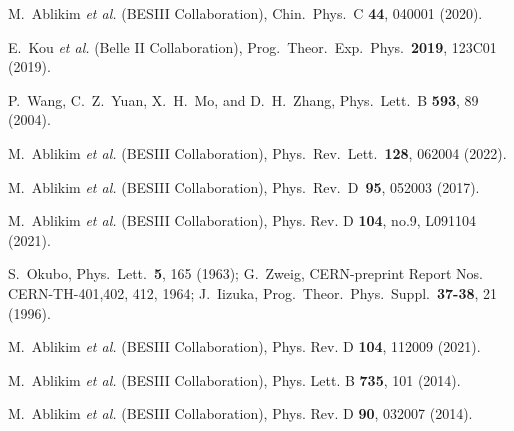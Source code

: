 \documentclass[%
preprint,
 amsmath,amssymb,
 aps,
]{revtex4-2}
\newcommand{\EE}{e^+e^-}
\newcommand{\jpsi}{J/\psi}
\newcommand{\gev}{\mathrm{GeV}}
\begin{document}
\begin{thebibliography}{**}
M.~Ablikim {\it et al.} (BESIII Collaboration),
Chin.\ Phys.\ C {\bf 44}, 040001 (2020).

E.~Kou {\it et al.} (Belle II Collaboration),
Prog.\ Theor.\ Exp.\ Phys.\ {\bf 2019}, 123C01 (2019).

P.~Wang, C.~Z.~Yuan, X.~H.~Mo, and D.~H.~Zhang,
Phys.\ Lett.\ B {\bf 593}, 89 (2004).

M.~Ablikim {\it et al.} (BESIII Collaboration),
Phys.\ Rev.\ Lett.\ {\bf128}, 062004 (2022).

M.~Ablikim {\it et al.} (BESIII Collaboration),
Phys.\ Rev.\ D\ {\bf 95}, 052003 (2017).

M.~Ablikim \textit{et al.} (BESIII Collaboration),
Phys. Rev. D \textbf{104}, no.9, L091104 (2021).

S.~Okubo, 
Phys.\ Lett.\ {\bf 5}, 165 (1963); 
G.~Zweig, CERN-preprint Report Nos. CERN-TH-401,402, 412, 1964;
J.~Iizuka,
Prog.\ Theor.\ Phys.\ Suppl.\ {\bf 37-38}, 21 (1996).

M.~Ablikim \textit{et al.} (BESIII Collaboration),
Phys. Rev. D \textbf{104}, 112009 (2021).

M.~Ablikim \textit{et al.} (BESIII Collaboration),
Phys. Lett. B \textbf{735}, 101 (2014).

M.~Ablikim \textit{et al.} (BESIII Collaboration),
Phys. Rev. D \textbf{90}, 032007 (2014).


\end{thebibliography}
\end{document}
